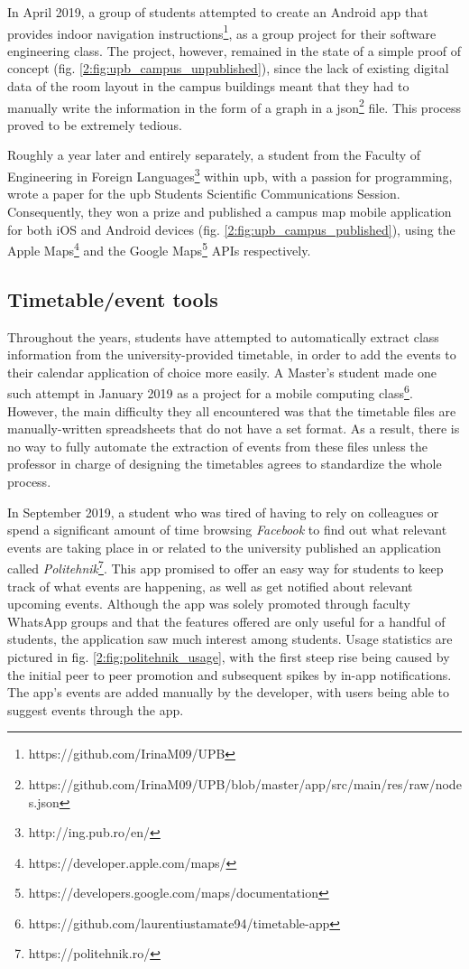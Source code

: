     In April 2019, a group of students attempted to create an Android app that provides indoor navigation instructions\footnote{https://github.com/IrinaM09/UPB}, as a group project for their software engineering class. The project, however, remained in the state of a simple proof of concept (fig. \ref{2:fig:upb_campus_unpublished}), since the lack of existing digital data of the room layout in the campus buildings meant that they had to manually write the information in the form of a graph in a \gls{json}\footnote{https://github.com/IrinaM09/UPB/blob/master/app/src/main/res/raw/nodes.json} file. This process proved to be extremely tedious.
    
    Roughly a year later and entirely separately, a student from the Faculty of Engineering in Foreign Languages\footnote{http://ing.pub.ro/en/} within \acrshort{upb}, with a passion for programming,  wrote a paper\cite{scurtu2020upb} for the \acrshort{upb} Students Scientific Communications Session. Consequently, they won a prize and published a campus map mobile application for both iOS and Android devices (fig. \ref{2:fig:upb_campus_published}), using the Apple Maps\footnote{https://developer.apple.com/maps/} and the Google Maps\footnote{https://developers.google.com/maps/documentation} APIs respectively.
    
    \subsection{Timetable/event tools} \label{2:existing_apps_timetable}
    Throughout the years, students have attempted to automatically extract class information from the university-provided timetable, in order to add the events to their calendar application of choice more easily. A Master's student made one such attempt in January 2019 as a project for a mobile computing class\footnote{https://github.com/laurentiustamate94/timetable-app}. However, the main difficulty they all encountered was that the timetable files are manually-written spreadsheets that do not have a set format. As a result, there is no way to fully automate the extraction of events from these files unless the professor in charge of designing the timetables agrees to standardize the whole process.
    
    In September 2019, a student who was tired of having to rely on colleagues or spend a significant amount of time browsing \textit{Facebook} to find out what relevant events are taking place in or related to the university published an application called \textit{Politehnik}\footnote{https://politehnik.ro/}. This app promised to offer an easy way for students to keep track of what events are happening, as well as get notified about relevant upcoming events. Although the app was solely promoted through faculty WhatsApp groups and that the features offered are only useful for a handful of students, the application saw much interest among students. Usage statistics are pictured in fig. \ref{2:fig:politehnik_usage}, with the first steep rise being caused by the initial peer to peer promotion and subsequent spikes by in-app notifications. The app's events are added manually by the developer, with users being able to suggest events through the app.
    
